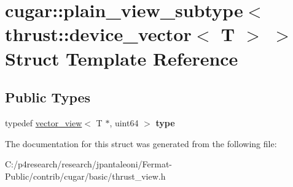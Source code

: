 \hypertarget{structcugar_1_1plain__view__subtype_3_01thrust_1_1device__vector_3_01_t_01_4_01_4}{}\section{cugar\+:\+:plain\+\_\+view\+\_\+subtype$<$ thrust\+:\+:device\+\_\+vector$<$ T $>$ $>$ Struct Template Reference}
\label{structcugar_1_1plain__view__subtype_3_01thrust_1_1device__vector_3_01_t_01_4_01_4}
\subsection*{Public Types}
\begin{DoxyCompactItemize}
\item 
\mbox{\label{structcugar_1_1plain__view__subtype_3_01thrust_1_1device__vector_3_01_t_01_4_01_4_a080dc8328dbbc2ce0681bdb55b981485}} 
typedef \hyperlink{structcugar_1_1vector__view}{vector\+\_\+view}$<$ T $\ast$, uint64 $>$ {\bfseries type}
\end{DoxyCompactItemize}


The documentation for this struct was generated from the following file\+:\begin{DoxyCompactItemize}
\item 
C\+:/p4research/research/jpantaleoni/\+Fermat-\/\+Public/contrib/cugar/basic/thrust\+\_\+view.\+h\end{DoxyCompactItemize}
